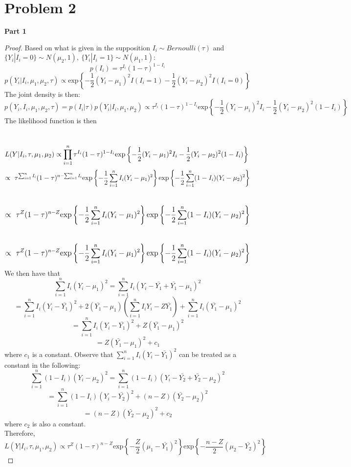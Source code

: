 \documentclass[10pt,a4paper]{article}
\begin{document}
\section*{Problem 2}
\textbf{Part 1}
\begin{proof}
Based on what is given in the supposition $I_i\sim Bernoulli(\tau)$ and $\{Y_i|I_i=0\}\sim N(\mu_2,1), \ \{Y_i|I_i=1\}\sim N(\mu_1,1)$:\\
$$p(I_i)=\tau^{I_i}(1-\tau)^{1-I_i}$$
$$p(Y_i|I_i, \mu_1, \mu_2, \tau)\propto \textrm{exp}\left\lbrace-\frac{1}{2}(Y_i-\mu_1)^2I(I_i=1)-\frac{1}{2}(Y_i-\mu_2)^2I(I_i=0)\right\rbrace$$
The joint density is then:
$$p(Y_i,I_i, \mu_1, \mu_2, \tau)=p(I_i \vert \tau)p(Y_i|I_i, \mu_1, \mu_2)\propto \tau^{I_i}(1-\tau)^{1-I_i}\textrm{exp}\left\lbrace-\frac{1}{2}(Y_i-\mu_i)^2I_i-\frac{1}{2}(Y_i-\mu_2)^2(1-I_i)\right\rbrace$$
The likelihood function is then\\
\\\
$L(Y \vert I_i, \tau, \mu_1,\mu_2)
\propto \mathlarger{\prod_{i=1}^{n}\tau^{I_i}(1-\tau)^{1-I_i}\textrm{exp}\left\lbrace-\frac{1}{2}(Y_i-\mu_1)^2I_i-\frac{1}{2}(Y_i-\mu_2)^2(1-I_i)\right\rbrace}$\\
$$\mathlarger{\propto \ \tau^{\sum_{i=1}^nI_i}(1-\tau)^{n-\sum_{i=1}^nI_i}\textrm{exp}\left\lbrace-\frac{1}{2}\sum_{i=1}^nI_i(Y_i-\mu_1)^2\right\rbrace\textrm{exp}\left\lbrace-\frac{1}{2}\sum_{i=1}^n(1-I_i)(Y_i-\mu_2)^2\right\rbrace}$$\\
$$\mathlarger{\propto \ \tau^Z(1-\tau)^{n-Z}\textrm{exp}\left\lbrace-\frac{1}{2}\sum_{i=1}^nI_i(Y_i-\mu_1)^2\right\rbrace\textrm{exp}\left\lbrace-\frac{1}{2}\sum_{i=1}^n(1-I_i)(Y_i-\mu_2)^2\right\rbrace}$$\\
$$\mathlarger{\propto \ \tau^Z(1-\tau)^{n-Z}\textrm{exp}\left\lbrace-\frac{1}{2}\sum_{i=1}^nI_i(Y_i-\mu_1)^2\right\rbrace\textrm{exp}\left\lbrace-\frac{1}{2}\sum_{i=1}^n(1-I_i)(Y_i-\mu_2)^2\right\rbrace}$$
We then have that\\
$$\sum_{i=1}^nI_i(Y_i-\mu_1)^2=\sum_{i=1}^nI_i(Y_i-\bar{Y_1}+\bar{Y_1}-\mu_1)^2 $$
$$=\sum_{i=1}^nI_i(Y_i-\bar{Y_1})^2+2(\bar{Y_1}-\mu_1)(\sum_{i=1}^nI_iY_i-Z\bar{Y_1})+\sum_{i=1}^nI_i(\bar{Y_1}-\mu_1)^2$$
$$=\sum_{i=1}^nI_i(Y_i-\bar{Y_1})^2+Z(\bar{Y_1}-\mu_1)^2 $$
$$=Z(\bar{Y_1}-\mu_1)^2+c_1 $$ where $c_1$ is a constant. 
Observe that $\sum_{i=1}^nI_i(Y_i-\bar{Y_1})^2$ can be treated as a constant in the following:\\
$$\sum_{i=1}^n(1-I_i)(Y_i-\mu_2)^2=\sum_{i=1}^n(1-I_i)(Y_i-\bar{Y_2}+\bar{Y_2}-\mu_2)^2$$
$$=\sum_{i=1}^n(1-I_i)(Y_i-\bar{Y_2})^2+(n-Z)(\bar{Y_2}-\mu_2)^2$$
$$=(n-Z)(\bar{Y_2}-\mu_2)^2+c_2$$
where $c_2$ is also a constant.\\
Therefore,\\
$$L(Y \vert I_i, \tau, \mu_1,\mu_2)\propto \tau^Z(1-\tau)^{n-Z}\textrm{exp}\left\lbrace-\frac{Z}{2}(\mu_1-\bar{Y_1})^2\right\rbrace\textrm{exp}\left\lbrace-\frac{n-Z}{2}(\mu_2-\bar{Y_2})^2\right\rbrace$$
\end{proof}
\end{document}
